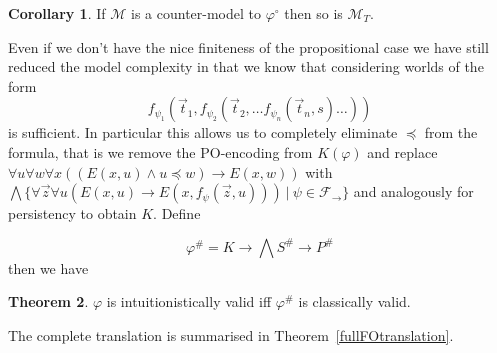 \documentclass[a4paper,12pt]{report}
\theoremstyle{definition}
\newtheorem{theorem}{Theorem}[section]
\theoremstyle{definition}
\newtheorem{corollary}[theorem]{Corollary}
\theoremstyle{definition}
\theoremstyle{definition}
\theoremstyle{definition}
\theoremstyle{definition}
\theoremstyle{definition}
\begin{document}
	
	\begin{corollary}
		If $\mathcal M$ is a counter-model to $\varphi^\circ$ then so is $\mathcal M_T$.
	\end{corollary}
	
	Even if we don't have the nice finiteness of the propositional case we have still reduced the model complexity in that we know that considering worlds of the form $$f_{\psi_1}(\vec t_1, f_{\psi_2}(\vec t_2, \dots f_{\psi_n}(\vec t_n, s)\dots))$$ is sufficient. In particular this allows us to completely eliminate $\preceq$ from the formula, that is we remove the PO-encoding from $K(\varphi)$ and replace $\forall u\forall w\forall x((E(x, u)\wedge u\preceq w)\to E(x, w))$ with $\bigwedge\{\forall \vec z\forall u(E(x, u)\to E(x, f_\psi(\vec z, u)))\:|\:\psi\in\mathcal F_\to\}$ and analogously for persistency to obtain $K$. Define
	
	$$\varphi^{\#} = K\to \bigwedge S^\#\to P^\#$$
	then we have 
	\begin{theorem}
		$\varphi$ is intuitionistically valid iff $\varphi^\#$ is classically valid.
	\end{theorem}
	The complete translation is summarised in Theorem~\ref{fullFOtranslation}.
	
\end{document}
